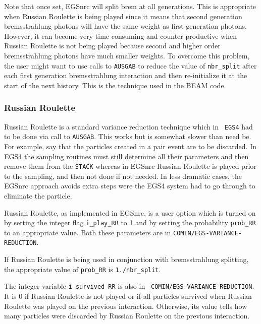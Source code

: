 Note that once
set, EGSnrc will split brem at all generations.  This is
appropriate when Russian Roulette is being played since it means that
second generation bremsstrahlung photons will have the same weight as first
generation photons.  However, it can become very time consuming and counter
productive when Russian Roulette is not being played because second and
higher order bremsstrahlung photons have much smaller weights. To overcome
this problem, the user might want to use calls to {\tt AUSGAB} to reduce the
value of {\tt nbr\_split} after each first generation bremsstrahlung
interaction and then re-initialize it at the start of the next history.
This is the technique used in the BEAM code\cite{Ro95,Ro98a}.


\subsubsection{Russian Roulette}
\label{rusrou}
Russian Roulette is a standard variance reduction technique which in {\tt
EGS4}
had to be done via call to {\tt AUSGAB}. This works but is somewhat slower than
need be. For example, say that the particles created in a pair
event are to be discarded. In EGS4 the sampling routines must still
determine all their parameters and then remove them from the {\tt STACK} whereas
in EGSnrc Russian Roulette is played prior to the sampling, and then
not done if not needed. In less dramatic cases, the EGSnrc approach avoids
extra steps were the EGS4 system had to go through to eliminate the
particle.

Russian Roulette, as implemented in EGSnrc, is a user option which is turned on by
setting the integer flag {\tt i\_play\_RR} to 1 and by setting the
probability {\tt prob\_RR} to an appropriate value. Both these parameters
are in {\tt COMIN/EGS-VARIANCE-REDUCTION}.

If Russian Roulette is being used in conjunction with bremsstrahlung
splitting, the appropriate value of {\tt prob\_RR} is {\tt 1./nbr\_split}.

The integer variable {\tt i\_survived\_RR} is also in  {\tt
COMIN/EGS-VARIANCE-REDUCTION}. It is 0 if Russian Roulette is not played or
if all particles survived when Russian Roulette was played on the previous
interaction.  Otherwise, its value tells how many particles were discarded
by Russian Roulette on the previous interaction.



